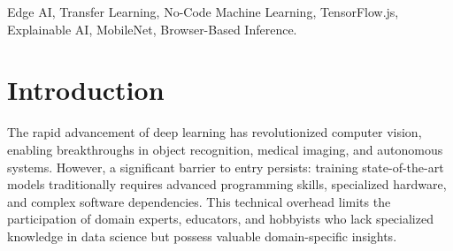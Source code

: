 \documentclass[conference]{IEEEtran}
\begin{document}
\begin{abstract}
The democratization of artificial intelligence relies heavily on accessible tooling that bridges the gap between complex neural architectures and non-expert developers. Traditional machine learning workflows demand substantial coding expertise, complex environment configurations, and access to significant cloud computing resources. To address these barriers, we present ModelForge AI Studio, a browser-oriented, no-code machine learning workspace tailored for image classification. Beyond generating classifiers, ModelForge implements an integrated transparency layer---encompassing stage-wise pipeline introspection, embedding-guided dataset assessment, epoch replay, and occlusion-sensitivity heatmaps---to foster pedagogical explainability. Leveraging TensorFlow.js and MobileNet-based transfer learning, the platform facilitates human-verified dataset refinement through dynamic labeling and multi-level data augmentation. By relocating the computational workload to the client edge via WebGL acceleration, the architecture adopts a resource-aware design that supports a privacy-preserving local workflow and reduces cloud dependency for training and inference. This paper details the system architecture, mathematical formulations, and a formal evaluation protocol for ModelForge AI Studio, positioning it as an accessible and interpretable edge AI solution.
\end{abstract}

\begin{IEEEkeywords}
Edge AI, Transfer Learning, No-Code Machine Learning, TensorFlow.js, Explainable AI, MobileNet, Browser-Based Inference.
\end{IEEEkeywords}

\section{Introduction}

The rapid advancement of deep learning has revolutionized computer vision, enabling breakthroughs in object recognition, medical imaging, and autonomous systems. However, a significant barrier to entry persists: training state-of-the-art models traditionally requires advanced programming skills, specialized hardware, and complex software dependencies. This technical overhead limits the participation of domain experts, educators, and hobbyists who lack specialized knowledge in data science but possess valuable domain-specific insights.
\end{document}
